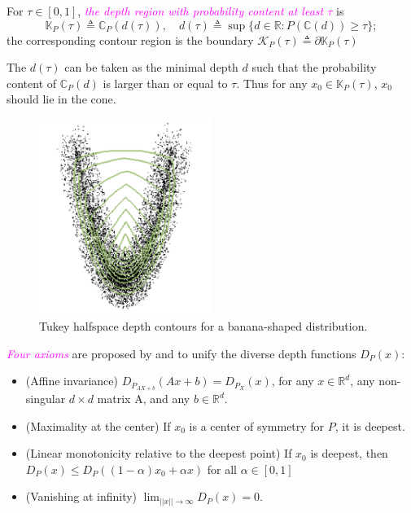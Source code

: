 \begin{definition}
	For $\tau \in [0, 1]$, \textit{\textcolor{magenta}{the depth region with probability content at least $\tau$}} is 
	\[
	\mathbb{K}_P(\tau) \triangleq \mathbb{C}_P(d(\tau)), \quad d(\tau) \triangleq \sup\{d \in \mathbb{R}: P(\mathbb{C}(d))\geq \tau\}; 
	\]
	the corresponding contour region is the boundary $\mathcal{K}_P(\tau) \triangleq \partial\mathbb{K}_P(\tau)$
\end{definition}
\begin{remark}
	The $d(\tau)$ can be taken as the minimal depth $d$ such that the probability content of $\mathbb{C}_P(d)$ is larger than or equal to $\tau$. Thus for any $x_0 \in \mathbb{K}_P(\tau)$, $x_0$ should lie in the cone.
\end{remark}

\begin{figure}
	\centering
	\includegraphics[width=0.5\textwidth]{Figures/Convex.png}
	\caption{Tukey halfspace depth contours for a banana-shaped distribution.}
	\label{fg: convex}
\end{figure} 

\textit{\textcolor{magenta}{Four axioms}} are proposed by \cite{liu1990notion} and \cite{zuo2000general} to unify the diverse depth functions $D_P(x)$:
\begin{itemize}
	\item (Affine invariance) $D_{P_{AX + b}}(Ax + b) = D_{P_X}(x)$, for any $x \in \mathbb{R}^d$, any non-singular $d \times d$ matrix A, and any $b \in \mathbb{R}^d$.
	\item (Maximality at the center) If $x_0$ is a center of symmetry for $P$, it is deepest.
	\item (Linear monotonicity relative to the deepest point) If $x_0$ is deepest, then $D_P(x) \leq D_P((1 - \alpha)x_0 + \alpha x)$ for all $\alpha \in [0, 1]$ 
	\item (Vanishing at infinity) $\lim_{||x|| \to \infty} D_P(x) = 0$.
\end{itemize}

